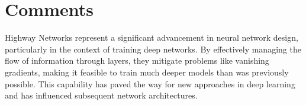 \section{Comments}
Highway Networks represent a significant advancement in neural network design, particularly in the context of training deep networks. By effectively managing the flow of information through layers, they mitigate problems like vanishing gradients, making it feasible to train much deeper models than was previously possible. This capability has paved the way for new approaches in deep learning and has influenced subsequent network architectures.
